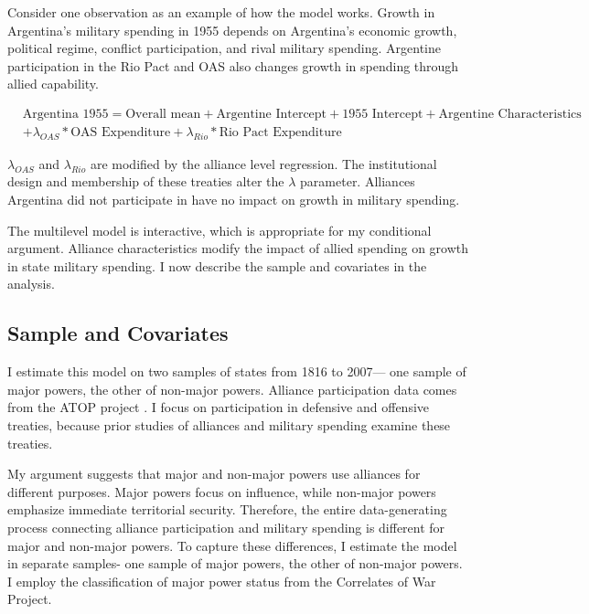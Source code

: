 \documentclass[12pt]{article}
\begin{document}
Consider one observation as an example of how the model works. 
Growth in Argentina's military spending in 1955 depends on Argentina's economic growth, political regime, conflict participation, and rival military spending. 
Argentine participation in the Rio Pact and OAS also changes growth in spending through allied capability. 


\begin{equation}
\begin{split}
& \mbox{Argentina 1955} = \mbox{Overall mean}
+ \mbox{Argentine Intercept} + \mbox{1955 Intercept} 
+ \mbox{Argentine Characteristics} \\
& + \lambda_{OAS} * \mbox{OAS Expenditure} + \lambda_{Rio} * \mbox{Rio Pact Expenditure}
\end{split} 
\end{equation}


$\lambda_{OAS}$ and $\lambda_{Rio}$ are modified by the alliance level regression. 
The institutional design and membership of these treaties alter the $\lambda$ parameter.
Alliances Argentina did not participate in have no impact on growth in military spending. 


The multilevel model is interactive, which is appropriate for my conditional argument. 
Alliance characteristics modify the impact of allied spending on growth in state military spending. 
I now describe the sample and covariates in the analysis.  



\subsection{Sample and Covariates} 

I estimate this model on two samples of states from 1816 to 2007--- one sample of major powers, the other of non-major powers. 
Alliance participation data comes from the ATOP project \citep{Leedsetal2002}. 
I focus on participation in defensive and offensive treaties, because prior studies of alliances and military spending examine these treaties. 


My argument suggests that major and non-major powers use alliances for different purposes.
Major powers focus on influence, while non-major powers emphasize immediate territorial security.  
Therefore, the entire data-generating process connecting alliance participation and military spending is different for major and non-major powers. 
To capture these differences, I estimate the model in separate samples- one sample of major powers, the other of non-major powers.
I employ the classification of major power status from the Correlates of War Project. 
\end{document}
